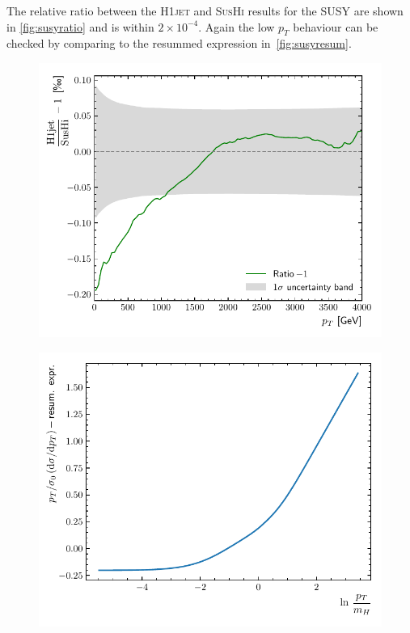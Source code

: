 \documentclass[12pt]{article}
\begin{document}
The relative ratio between the \textsc{H1jet} and \textsc{SusHi} results for the SUSY are shown in \autoref{fig:susyratio} and is within $2 \times 10^{-4}$. Again the low $p_T$ behaviour can be checked by comparing to the resummed expression in~\autoref{fig:susyresum}. 

\begin{figure}[tbh] 
\centering
\begin{minipage}{.485\textwidth}
  \centering
  \includegraphics[width=\linewidth]{figures/SUSYratio.pdf}
  \label{fig:susyratio}
\end{minipage}%
\hfill%
\begin{minipage}{.485\textwidth}
  \centering
  \includegraphics[width=\linewidth]{figures/SUSYresum.pdf}

\end{minipage}
\end{figure}
\end{document}
